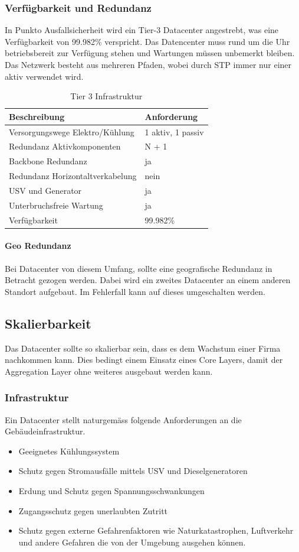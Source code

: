 \subsubsection{Verfügbarkeit und Redundanz}
In Punkto Ausfallsicherheit wird ein Tier-3 Datacenter angestrebt, was eine Verfügbarkeit von 99.982\% verspricht. Das Datencenter muss rund um die Uhr betriebsbereit zur Verfügung stehen und Wartungen müssen unbemerkt bleiben. Das Netzwerk besteht aus mehreren Pfaden, wobei durch STP immer nur einer aktiv verwendet wird.  
\begin{table}[h]
	\centering
	\begin{tabu}{l l}
		\toprule
		Beschreibung & Anforderung \\
		\midrule
		Versorgungswege Elektro/Kühlung & 1 aktiv, 1 passiv \\
		Redundanz Aktivkomponenten & N + 1 \\
		Backbone Redundanz & ja\\
		Redundanz Horizontaltverkabelung & nein\\
		USV und Generator & ja\\
		Unterbruchsfreie Wartung & ja\\
		Verfügbarkeit & 99.982\% \\
		\bottomrule
	\end{tabu}
	\caption{Tier 3 Infrastruktur}
\end{table}

\paragraph{Geo Redundanz}
Bei Datacenter von diesem Umfang, sollte eine geografische Redundanz in Betracht gezogen werden. Dabei wird ein zweites Datacenter an einem anderen Standort aufgebaut. Im Fehlerfall kann auf dieses umgeschalten werden. 

\subsection{Skalierbarkeit}
Das Datacenter sollte so skalierbar sein, dass es dem Wachstum einer Firma nachkommen kann. Dies bedingt einem Einsatz eines Core Layers, damit der Aggregation Layer ohne weiteres ausgebaut werden kann.

\subsubsection{Infrastruktur}
Ein Datacenter stellt naturgemäss folgende Anforderungen an die Gebäudeinfrastruktur.
\begin{itemize}
	\item Geeignetes Kühlungssystem
	\item Schutz gegen Stromausfälle mittels USV und Dieselgeneratoren
	\item Erdung und Schutz gegen Spannungsschwankungen
	\item Zugangsschutz gegen unerlaubten Zutritt
	\item Schutz gegen externe Gefahrenfaktoren wie Naturkatastrophen, Luftverkehr und andere Gefahren die von der Umgebung ausgehen können.
\end{itemize}

